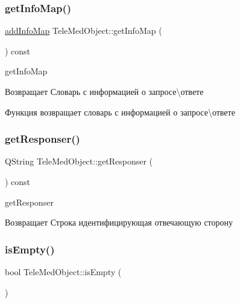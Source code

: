 \subsubsection{\texorpdfstring{get\+Info\+Map()}{getInfoMap()}}
{\footnotesize\ttfamily \hyperlink{dbform_8h_a1ec1a645f41e1c6544d384ca863a936c}{add\+Info\+Map} Tele\+Med\+Object\+::get\+Info\+Map (\begin{DoxyParamCaption}{ }\end{DoxyParamCaption}) const}



get\+Info\+Map 

\begin{DoxyReturn}{Возвращает}
Словарь с информацией о запросе\textbackslash{}ответе
\end{DoxyReturn}
Функция возвращает словарь с информацией о запросе\textbackslash{}ответе \mbox{\label{classTeleMedObject_a5d79f3bf01cc9ee2b714f9fa1da422df}} 
\subsubsection{\texorpdfstring{get\+Responser()}{getResponser()}}
{\footnotesize\ttfamily Q\+String Tele\+Med\+Object\+::get\+Responser (\begin{DoxyParamCaption}{ }\end{DoxyParamCaption}) const}



get\+Responser 

\begin{DoxyReturn}{Возвращает}
Строка идентифицирующая отвечающую сторону 
\end{DoxyReturn}
\mbox{\label{classTeleMedObject_a651ae9fa2690217a8327d194682ef60c}} 
\subsubsection{\texorpdfstring{is\+Empty()}{isEmpty()}}
{\footnotesize\ttfamily bool Tele\+Med\+Object\+::is\+Empty (\begin{DoxyParamCaption}{ }\end{DoxyParamCaption})}



